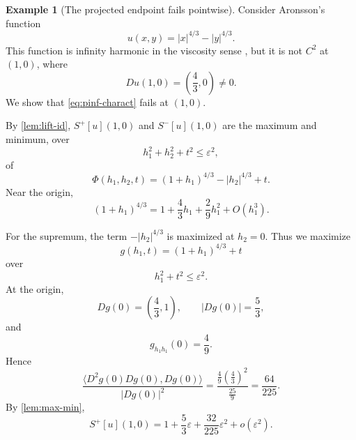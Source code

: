 \documentclass[12pt,reqno]{amsart}
\numberwithin{equation}{section}
\theoremstyle{plain}
\theoremstyle{definition}
\newtheorem{example}[example]{Example}
\theoremstyle{remark}
\newcommand{\Sp}{S^+}
\newcommand{\Sm}{S^-}
\begin{document}
\begin{example}[The projected endpoint fails pointwise]
\label{ex:aronsson}
Consider Aronsson's function
\begin{equation}\label{eq:aronsson}
  u(x,y)=|x|^{4/3}-|y|^{4/3}.
\end{equation}
This function is infinity harmonic in the viscosity sense
\cite{Aronsson84}, but it is not $C^2$ at $(1,0)$, where
\[
  Du(1,0)=\left(\frac43,0\right)\ne0.
\]
We show that \eqref{eq:pinf-charact} fails at $(1,0)$.

By \cref{lem:lift-id}, $\Sp[u](1,0)$ and $\Sm[u](1,0)$ are the maximum
and minimum, over
\[
  h_1^2+h_2^2+t^2\le\varepsilon^2,
\]
of
\[
  \Phi(h_1,h_2,t)
  =
  (1+h_1)^{4/3}-|h_2|^{4/3}+t.
\]
Near the origin,
\[
  (1+h_1)^{4/3}
  =
  1+\frac43h_1+\frac29h_1^2+O(h_1^3).
\]

For the supremum, the term $-|h_2|^{4/3}$ is maximized at $h_2=0$.
Thus we maximize
\[
  g(h_1,t)=(1+h_1)^{4/3}+t
\]
over
\[
  h_1^2+t^2\le\varepsilon^2.
\]
At the origin,
\[
  Dg(0)=\left(\frac43,1\right),
  \qquad
  |Dg(0)|=\frac53,
\]
and
\[
  g_{h_1h_1}(0)=\frac49.
\]
Hence
\[
  \frac{\langle D^2g(0)Dg(0),Dg(0)\rangle}{|Dg(0)|^2}
  =
  \frac{\frac49\left(\frac43\right)^2}{\frac{25}{9}}
  =
  \frac{64}{225}.
\]
By \cref{lem:max-min},
\[
  \Sp[u](1,0)
  =
  1+\frac53\varepsilon+\frac{32}{225}\varepsilon^2
  +
  o(\varepsilon^2).
\]


\end{example}
\end{document}
